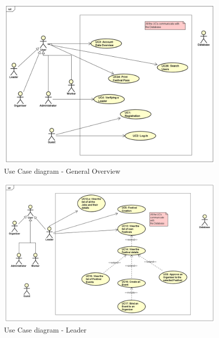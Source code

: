 				\begin{figure}[H]
					\includegraphics[width=\linewidth]{diagrams/NewUCD_General.png}
					\caption{Use Case diagram - General Overview}
					\label{fig:uc_diag_0_general}
				\end{figure}
			
				\begin{figure}[H]
					\includegraphics[width=\linewidth]{diagrams/NewUCD_Leader.png}
					\caption{Use Case diagram - Leader}
					\label{fig:uc_diag_1_leader}
				\end{figure}
		

